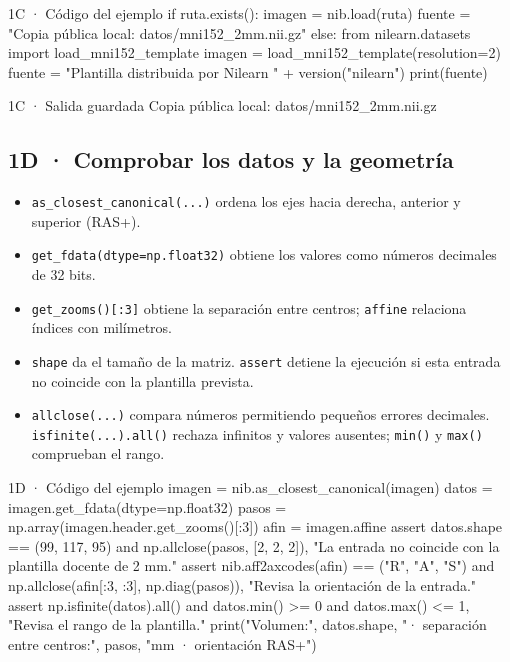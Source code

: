 \begin{CodigoVivo}{1C · Código del ejemplo}
if ruta.exists():
    imagen = nib.load(ruta)
    fuente = "Copia pública local: datos/mni152_2mm.nii.gz"
else:
    from nilearn.datasets import load_mni152_template
    imagen = load_mni152_template(resolution=2)
    fuente = "Plantilla distribuida por Nilearn " + version("nilearn")
print(fuente)
\end{CodigoVivo}


\begin{Salida}{1C · Salida guardada}
Copia pública local: datos/mni152_2mm.nii.gz
\end{Salida}



\subsection*{1D · Comprobar los datos y la geometría}

\label{vivo:1d}

\begin{itemize}[leftmargin=1.4em,itemsep=2pt,topsep=3pt]
\item \texttt{\small as\_closest\_canonical(\allowbreak{}.\allowbreak{}.\allowbreak{}.\allowbreak{})\allowbreak{}} ordena los ejes hacia derecha, anterior y superior (RAS+).
\item \texttt{\small get\_fdata(\allowbreak{}dtype=np.\allowbreak{}float32)\allowbreak{}} obtiene los valores como números decimales de 32 bits.
\item \texttt{\small get\_zooms(\allowbreak{})\allowbreak{}[:3]} obtiene la separación entre centros; \texttt{\small affine} relaciona índices con milímetros.
\item \texttt{\small shape} da el tamaño de la matriz. \texttt{\small assert} detiene la ejecución si esta entrada no coincide con la plantilla prevista.
\item \texttt{\small allclose(\allowbreak{}.\allowbreak{}.\allowbreak{}.\allowbreak{})\allowbreak{}} compara números permitiendo pequeños errores decimales. \texttt{\small isfinite(\allowbreak{}.\allowbreak{}.\allowbreak{}.\allowbreak{})\allowbreak{}.\allowbreak{}all(\allowbreak{})\allowbreak{}} rechaza infinitos y valores ausentes; \texttt{\small min(\allowbreak{})\allowbreak{}} y \texttt{\small max(\allowbreak{})\allowbreak{}} comprueban el rango.
\end{itemize}

\begin{CodigoVivo}{1D · Código del ejemplo}
imagen = nib.as_closest_canonical(imagen)
datos = imagen.get_fdata(dtype=np.float32)
pasos = np.array(imagen.header.get_zooms()[:3])
afin = imagen.affine
assert datos.shape == (99, 117, 95) and np.allclose(pasos, [2, 2, 2]), "La entrada no coincide con la plantilla docente de 2 mm."
assert nib.aff2axcodes(afin) == ("R", "A", "S") and np.allclose(afin[:3, :3], np.diag(pasos)), "Revisa la orientación de la entrada."
assert np.isfinite(datos).all() and datos.min() >= 0 and datos.max() <= 1, "Revisa el rango de la plantilla."
print("Volumen:", datos.shape, "· separación entre centros:", pasos, "mm · orientación RAS+")
\end{CodigoVivo}


